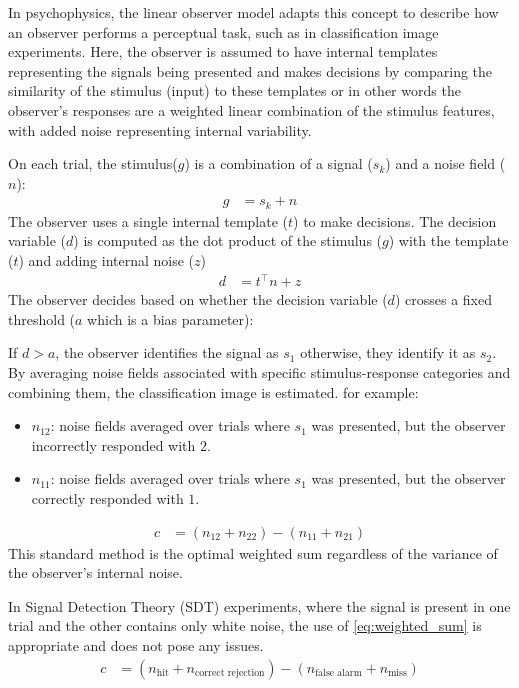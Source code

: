 In psychophysics, the linear observer model adapts this concept to describe how an observer performs a perceptual task, such as in classification image experiments. Here, the observer is assumed to have internal templates representing the signals being presented and makes decisions by comparing the similarity of the stimulus (input) to these templates or in other words the observer's responses are a weighted linear combination of the stimulus features, with added noise representing internal variability.

On each trial, the stimulus($g$) is a combination of a signal ($s_k$) and a noise field ($n$):
\begin{align}
g& =s_k+n 
\end{align}
The observer uses a single internal template ($t$) to make decisions. The decision variable ($d$) is computed as the dot product of the stimulus ($g$) with the template ($t$) and adding internal noise ($z$)
\begin{align}
d& =t^\top n+z 
\end{align}
The observer decides based on whether the decision variable ($d$) crosses a fixed threshold ($a$ which is a bias parameter):

If $d>a$, the observer identifies the signal as $s_1$ otherwise, they identify it as $s_2$.
By averaging noise fields associated with specific stimulus-response categories and combining them, the classification image is estimated. for example:
\begin{itemize}
\item $n_{12}$: noise fields averaged over trials where $s_1$ was presented, but the observer incorrectly responded with $2$.
\item $n_{11}$: noise fields averaged over trials where $s_1$ was presented, but the observer correctly responded with $1$.
\end{itemize}
\begin{align}
c &= (n_{12} + n_{22}) - (n_{11} + n_{21}) \label{eq:weighted_sum}
\end{align}
This standard method is the optimal weighted sum regardless of the variance of the observer’s internal noise.

In Signal Detection Theory (SDT) experiments, where the signal is present in one trial and the other contains only white noise, the use of  \ref{eq:weighted_sum} is appropriate and does not pose any issues.
\begin{align}
c& = \left( n_{\text{hit}} + n_{\text{correct rejection}} \right) - \left( n_{\text{false alarm}} +n_{\text{miss}} \right)
\end{align}

